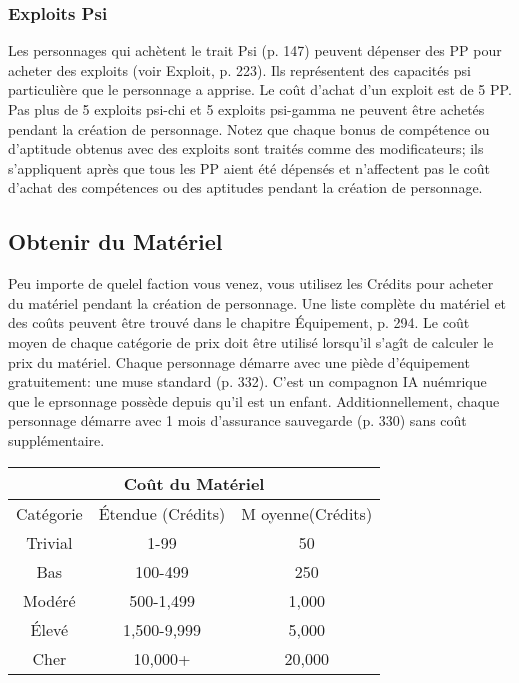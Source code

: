 \subsubsection{Exploits Psi} \label{sec:purchasing-psi-sleights} 

Les personnages qui achètent le trait Psi (p. 147) peuvent dépenser des PP pour acheter des exploits (voir Exploit, p. 223). Ils représentent des capacités psi particulière que le personnage a apprise. Le coût d'achat d'un exploit est de 5 PP. Pas plus de 5 exploits psi-chi et 5 exploits psi-gamma ne peuvent être achetés pendant la création de personnage. Notez que chaque bonus de compétence ou d'aptitude obtenus avec des exploits sont traités comme des modificateurs; ils s'appliquent après que tous les PP aient été dépensés et n'affectent pas le coût d'achat des compétences ou des aptitudes pendant la création de personnage. 

\subsection{Obtenir du Matériel} \label{sec:purchase-gear} 

Peu importe de quelel faction vous venez, vous utilisez les Crédits pour acheter du matériel pendant la création de personnage. Une liste complète du matériel et des coûts peuvent être trouvé dans le chapitre Équipement, p. 294. Le coût moyen de chaque catégorie de prix doit être utilisé lorsqu'il s'agît de calculer le prix du matériel. Chaque personnage démarre avec une piède d'équipement gratuitement: une muse standard (p. 332). C'est un compagnon IA nuémrique que le eprsonnage possède depuis qu'il est un enfant. Additionnellement, chaque personnage démarre avec 1 mois d'assurance sauvegarde (p. 330) sans coût supplémentaire. 

\begin{center} \begin{tabular}{|c|c|c|} \hline

\multicolumn{3}{|c|}{Coût du Matériel} \\ \hline

Catégorie &Étendue (Crédits) &M oyenne(Crédits)\\ \hline

Trivial &1-99 &50\\ \hline

Bas &100-499 &250\\ \hline

Modéré &500-1,499 &1,000\\ \hline

Élevé &1,500-9,999 &5,000\\ \hline

Cher &10,000+ &20,000\\ \hline \end{tabular} \end{center} 

